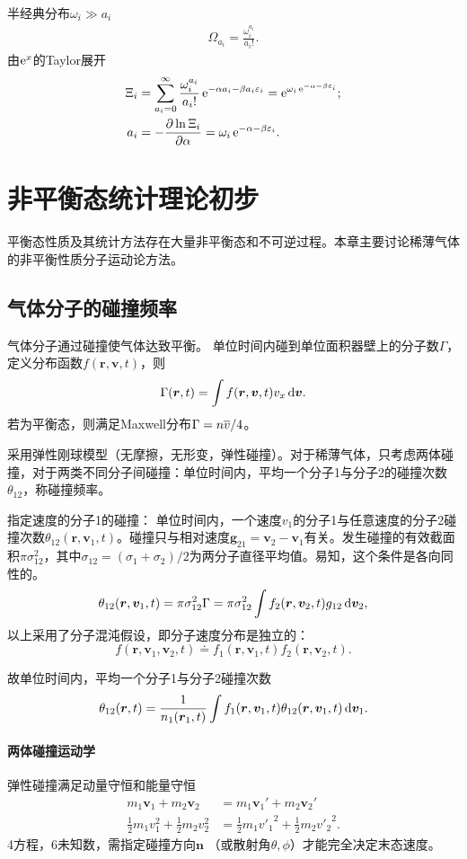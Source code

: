 半经典分布$\omega_i\gg a_i$ 
\begin{align}
	\Omega_{a_i}=\frac{\omega_i^{a_i}}{a_i!}.
\end{align}
由$\mathop{}\!\mathrm{e}^{x}$的Taylor展开
\begin{align}
	\Xi_i&=\sum_{a_i=0}^\infty\frac{\omega_i^{a_i}}{a_i!}\e{-\alpha a_i-\beta a_i\varepsilon_i}=\e{\omega_i\e{-\alpha-\beta\varepsilon_i}};\\
	a_i&=-\pv{\ln\Xi_i}\alpha=\omega_i\e{-\alpha-\beta\varepsilon_i}.
\end{align}
\clearpage
\section{非平衡态统计理论初步}
平衡态性质及其统计方法存在大量非平衡态和不可逆过程。本章主要讨论稀薄气体的非平衡性质分子运动论方法。
\subsection{气体分子的碰撞频率}
气体分子通过碰撞使气体达致平衡。
单位时间内碰到单位面积器壁上的分子数$\Gamma$，定义分布函数$f(\bm r,\bm v,t)$，则
\[
	\Gamma(\bm r,t)=\int f(\bm r,\bm v,t)v_x\mathop{}\!\mathrm{d}\bm v.
\]
若为平衡态，则满足Maxwell分布$\Gamma=n\overline v/4$。

采用弹性刚球模型（无摩擦，无形变，弹性碰撞）。对于稀薄气体，只考虑两体碰撞，对于两类不同分子间碰撞：单位时间内，平均一个分子1与分子2的碰撞次数$\theta_{12}$，称碰撞频率。

指定速度的分子1的碰撞：
单位时间内，一个速度$v_1$的分子1与任意速度的分子2碰撞次数$\theta_{12}(\bm r,\bm v_1,t)$。碰撞只与相对速度$\bm g_{21}=\bm v_2-\bm v_1$有关。发生碰撞的有效截面积$\pi\sigma^2_{12}$，其中$\sigma_{12}=(\sigma_1+\sigma_2)/2$为两分子直径平均值。易知，这个条件是各向同性的。
\begin{align}
	\theta_{12}(\bm r,\bm v_1,t)=\pi\sigma_{12}^2\Gamma=\pi\sigma_{12}^2\int f_2(\bm r,\bm v_2,t)g_{12}\mathop{}\!\mathrm{d}\bm v_2,
\end{align}
以上采用了分子混沌假设，即分子速度分布是独立的：
\[
	f(\bm r,\bm v_1,\bm v_2,t)\doteq f_1(\bm r,\bm v_1,t)f_2(\bm r,\bm v_2,t).
\]

故单位时间内，平均一个分子1与分子2碰撞次数
\begin{align}
	\theta_{12}(\bm r,t)=\frac1{n_1(\bm r_1,t)}\int f_1(\bm r,\bm v_1,t)\theta_{12}(\bm r,\bm v_1,t)\mathop{}\!\mathrm{d}\bm v_1.
\end{align}
\paragraph*{两体碰撞运动学}
弹性碰撞满足动量守恒和能量守恒
\begin{align}
	m_1\bm v_1+m_2\bm v_2&=m_1\bm v_1'+m_2\bm v_2'\\
	\frac12m_1v_1^2+\frac12m_2v_2^2&=\frac12m_1{v'_1}^2+\frac12m_2{v'_2}^2.
\end{align}
4方程，6未知数，需指定碰撞方向$\bm n$ （或散射角$\theta,\phi$）才能完全决定末态速度。

